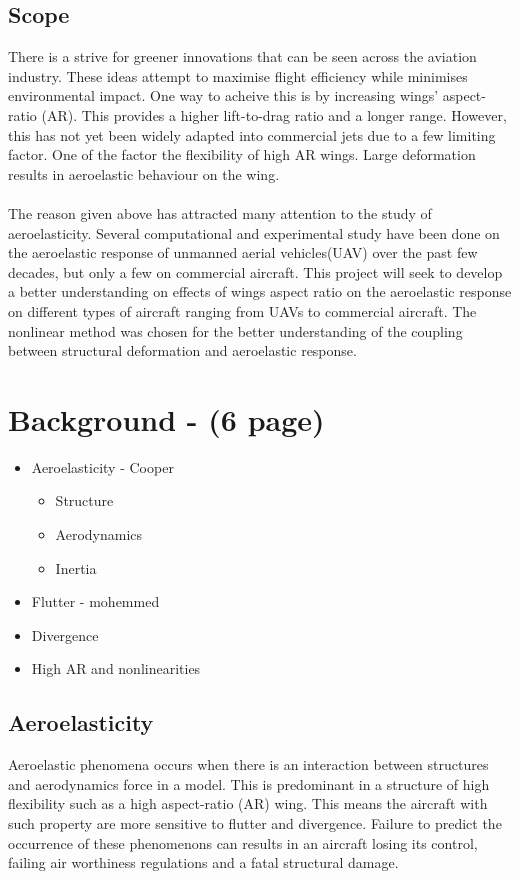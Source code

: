 \documentclass{article}
\begin{document}
\subsection{Scope} 
There is a strive for greener innovations that can be seen across the aviation industry. These ideas attempt to maximise flight efficiency while minimises environmental impact. One way to acheive this is by increasing wings' aspect-ratio (AR). This provides a higher lift-to-drag ratio and a longer range. However, this has not yet been widely adapted into commercial jets due to a few limiting factor. One of the factor the flexibility of high AR wings. Large deformation results in aeroelastic behaviour on the wing.\\ \\
The reason given above has attracted many attention to the study of aeroelasticity. Several computational and experimental study have been done on the aeroelastic response of unmanned aerial vehicles(UAV) over the past few decades, but only a few on commercial aircraft. This project will seek to develop a better understanding on effects of wings aspect ratio on the aeroelastic response on different types of aircraft ranging from UAVs to commercial aircraft. The nonlinear method was chosen for the better understanding of the coupling between structural deformation and aeroelastic response. 

\newpage
\section{Background - (6 page)}
\begin{itemize}
    \item Aeroelasticity - Cooper
    \begin{itemize}
        \item Structure
        \item Aerodynamics
        \item Inertia
    \end{itemize}
    \item Flutter - mohemmed
    \item Divergence
    \item High AR and nonlinearities
\end{itemize}
\subsection{Aeroelasticity}
Aeroelastic phenomena occurs when there is an interaction between structures and aerodynamics force in a model. This is predominant in a structure of high flexibility such as a high aspect-ratio (AR) wing. This means the aircraft with such property are more sensitive to flutter and divergence. Failure to predict the occurrence of these phenomenons can results in an aircraft losing its control, failing air worthiness regulations and a fatal structural damage.\\
\end{document}
